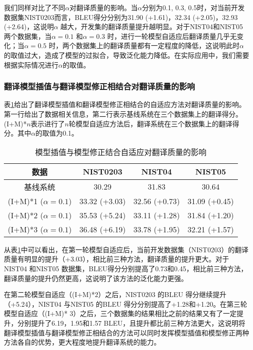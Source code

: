 \documentclass[master, winfont]{njuthesis}
\begin{document}
我们同样对比了不同$\alpha$对翻译质量的影响。当$\alpha$分别为0.1, 0.3, 0.5时，对当前开发数据集NIST0203而言，BLEU得分分别为31.90 (+1.61)，32.34 (+2.05)，32.93 (+2.64)，这说明$\alpha$ 越大，开发集的翻译质量提升越明显。对于NIST04和NIST05两个数据集，当$\alpha=0.1$ 和$\alpha=0.3$ 时，进行一轮模型自适应后翻译质量几乎无变化；当$\alpha=0.5$ 时，两个数据集上的翻译质量都有一定程度的降低，这说明此时$\alpha$ 的取值过大，造成了模型的过拟合，导致泛化能力降低。在实际应用中，我们需要根据实际情况进行$\alpha$的取值。
\subsubsection{翻译模型插值与翻译模型修正相结合对翻译质量的影响}
表\ref{table:adaptation4}给出了翻译模型插值和翻译模型修正相结合的自适应方法对翻译质量的影响。第一行给出了数据相关信息，第二行表示基线系统在三个数据集上的翻译得分。(I+M)*$n$表示进行了$n$轮模型自适应方法后，翻译系统在三个数据集上的翻译得分。其中$\alpha$的取值为0.1。

\begin{table}[!htb]
\begin{center}
\begin{tabular}{c|c|c|c}
\hline
数据& NIST0203 & NIST04 & NIST05\\
\hline
基线系统 & 30.29 & 31.83 & 30.64 \\
\hline
(I+M)*1 ($\alpha = 0.1$) & 33.32 (+3.03) & 32.56 (+0.73)& 31.09 (+0.45)\\
\hline
(I+M)*2 ($\alpha = 0.1$) & 35.53 (+5.24) & 33.11 (+1.28) & 31.84 (+1.20)\\
\hline
(I+M)*3 ($\alpha = 0.1$) & 36.48 (+6.19) & 33.78 (+1.95) & 32.21 (+1.57)\\
\hline
\end{tabular}
\end{center}
\caption{\label{table:adaptation4} 模型插值与模型修正结合自适应对翻译质量的影响}
\end{table}

从表\ref{table:adaptation4}中可以看出，在第一轮模型自适应后，当前开发数据集（NIST0203）的翻译质量有明显的提升（+3.03），相比前三种方法，翻译质量的提升更大。对于NIST04 和NIST05 数据集，BLEU得分分别提高了0.73和0.45，相比前三种方法，翻译质量的提升仍然更高，这说明了该方法的泛化能力更强。

在第二轮模型自适应（(I+M)*$2$）之后，NIST0203 的BLEU 得分继续提升（+5.24），NIST04 与NIST05 的BLEU 得分分别提高了+1.28和+1.20。在第三轮模型自适应（(I+M)* $3$）之后，三个数据集的结果相比之前的结果又有了一定提升，分别提升了6.19，1.95和1.57 BLEU，且提升都比前三种方法更大，这说明将翻译模型插值与翻译模型修正相结合的方法可以同时发挥模型插值和模型修正两种方法各自的优势，更大程度地提升翻译系统的能力。
\end{document}
